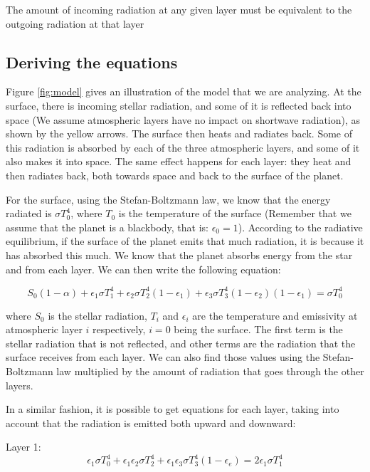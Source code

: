 \documentclass[a4paper,12pt]{article}
\begin{document}
The amount of incoming radiation at any given layer must be equivalent to the outgoing radiation at that layer

\subsection*{Deriving the equations}

Figure \ref{fig:model} gives an illustration of the model that we are analyzing. At the surface, there is incoming stellar radiation, and some of it is reflected back into space (We assume atmospheric layers have no impact on shortwave radiation), as shown by the yellow arrows. The surface then heats and radiates back. Some of this radiation is absorbed by each of the three atmospheric layers, and some of it also makes it into space. The same effect happens for each layer: they heat and then radiates back, both towards space and back to the surface of the planet.

For the surface, using the Stefan-Boltzmann law, we know that the energy radiated is $\sigma T_0^4$, where $T_0$ is the temperature of the surface (Remember that we assume that the planet is a blackbody, that is: $\epsilon_0=1$). According to the radiative equilibrium, if the surface of the planet emits that much radiation, it is because it has absorbed this much. We know that the planet absorbs energy from the star and from each layer. We can then write the following equation:

\begin{equation}
    S_0(1-\alpha)+\epsilon_1 \sigma T_1^4 + \epsilon_2 \sigma T_2^4(1-\epsilon_1)+\epsilon_3\sigma T_3^4 (1-\epsilon_2) (1-\epsilon_1) = \sigma T_0^4
\end{equation}

where $S_0$ is the stellar radiation, $T_i$ and $\epsilon_i$ are the temperature and emissivity at atmospheric layer $i$ respectively, $i=0$ being the surface. The first term is the stellar radiation that is not reflected, and other terms are the radiation that the surface receives from each layer. We can also find those values using the Stefan-Boltzmann law multiplied by the amount of radiation that goes through the other layers.\newline

In a similar fashion, it is possible to get equations for each layer, taking into account that the radiation is emitted both upward and downward:\newline

Layer 1:
\begin{equation}
    \epsilon_1 \sigma T_0^4 + \epsilon_1 \epsilon_2 \sigma T_2^4 +\epsilon_1 \epsilon_3 \sigma T_3^4 (1-\epsilon_e) = 2 \epsilon_1 \sigma T_1^4
\end{equation}
\end{document}
